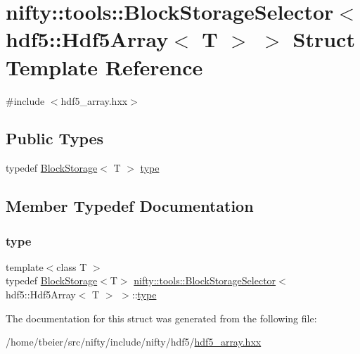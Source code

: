 \hypertarget{structnifty_1_1tools_1_1BlockStorageSelector_3_01hdf5_1_1Hdf5Array_3_01T_01_4_01_4}{}\section{nifty\+:\+:tools\+:\+:Block\+Storage\+Selector$<$ hdf5\+:\+:Hdf5\+Array$<$ T $>$ $>$ Struct Template Reference}
\label{structnifty_1_1tools_1_1BlockStorageSelector_3_01hdf5_1_1Hdf5Array_3_01T_01_4_01_4}


{\ttfamily \#include $<$hdf5\+\_\+array.\+hxx$>$}

\subsection*{Public Types}
\begin{DoxyCompactItemize}
\item 
typedef \hyperlink{classnifty_1_1tools_1_1BlockStorage}{Block\+Storage}$<$ T $>$ \hyperlink{structnifty_1_1tools_1_1BlockStorageSelector_3_01hdf5_1_1Hdf5Array_3_01T_01_4_01_4_a465a6096ba221978bf42a5edbcd0ddd3}{type}
\end{DoxyCompactItemize}


\subsection{Member Typedef Documentation}
\mbox{\label{structnifty_1_1tools_1_1BlockStorageSelector_3_01hdf5_1_1Hdf5Array_3_01T_01_4_01_4_a465a6096ba221978bf42a5edbcd0ddd3}} 
\subsubsection{\texorpdfstring{type}{type}}
{\footnotesize\ttfamily template$<$class T $>$ \\
typedef \hyperlink{classnifty_1_1tools_1_1BlockStorage}{Block\+Storage}$<$T$>$ \hyperlink{structnifty_1_1tools_1_1BlockStorageSelector}{nifty\+::tools\+::\+Block\+Storage\+Selector}$<$ hdf5\+::\+Hdf5\+Array$<$ T $>$ $>$\+::\hyperlink{structnifty_1_1tools_1_1BlockStorageSelector_3_01hdf5_1_1Hdf5Array_3_01T_01_4_01_4_a465a6096ba221978bf42a5edbcd0ddd3}{type}}



The documentation for this struct was generated from the following file\+:\begin{DoxyCompactItemize}
\item 
/home/tbeier/src/nifty/include/nifty/hdf5/\hyperlink{hdf5__array_8hxx}{hdf5\+\_\+array.\+hxx}\end{DoxyCompactItemize}

